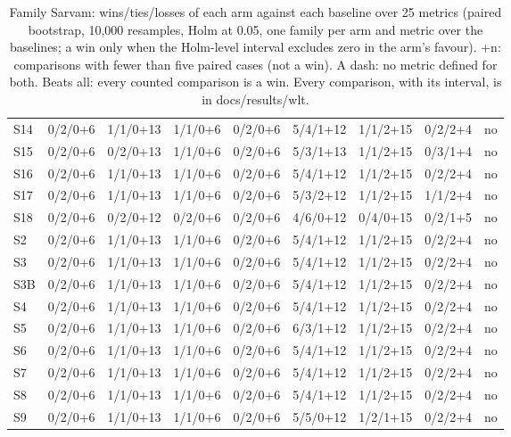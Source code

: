 \begin{table}[!t]
\begin{adjustbox}{max width=\textwidth}
\begin{tabular}{@{}lcccccccc@{}}
S14 & 0/2/0+6 & 1/1/0+13 & 1/1/0+6 & 0/2/0+6 & 5/4/1+12 & 1/1/2+15 & 0/2/2+4 & no \\
S15 & 0/2/0+6 & 0/2/0+13 & 1/1/0+6 & 0/2/0+6 & 5/3/1+13 & 1/1/2+15 & 0/3/1+4 & no \\
S16 & 0/2/0+6 & 1/1/0+13 & 1/1/0+6 & 0/2/0+6 & 5/4/1+12 & 1/1/2+15 & 0/2/2+4 & no \\
S17 & 0/2/0+6 & 1/1/0+13 & 1/1/0+6 & 0/2/0+6 & 5/3/2+12 & 1/1/2+15 & 1/1/2+4 & no \\
S18 & 0/2/0+6 & 0/2/0+12 & 0/2/0+6 & 0/2/0+6 & 4/6/0+12 & 0/4/0+15 & 0/2/1+5 & no \\
S2 & 0/2/0+6 & 1/1/0+13 & 1/1/0+6 & 0/2/0+6 & 5/4/1+12 & 1/1/2+15 & 0/2/2+4 & no \\
S3 & 0/2/0+6 & 1/1/0+13 & 1/1/0+6 & 0/2/0+6 & 5/4/1+12 & 1/1/2+15 & 0/2/2+4 & no \\
S3B & 0/2/0+6 & 1/1/0+13 & 1/1/0+6 & 0/2/0+6 & 5/4/1+12 & 1/1/2+15 & 0/2/2+4 & no \\
S4 & 0/2/0+6 & 1/1/0+13 & 1/1/0+6 & 0/2/0+6 & 5/4/1+12 & 1/1/2+15 & 0/2/2+4 & no \\
S5 & 0/2/0+6 & 1/1/0+13 & 1/1/0+6 & 0/2/0+6 & 6/3/1+12 & 1/1/2+15 & 0/2/2+4 & no \\
S6 & 0/2/0+6 & 1/1/0+13 & 1/1/0+6 & 0/2/0+6 & 5/4/1+12 & 1/1/2+15 & 0/2/2+4 & no \\
S7 & 0/2/0+6 & 1/1/0+13 & 1/1/0+6 & 0/2/0+6 & 5/4/1+12 & 1/1/2+15 & 0/2/2+4 & no \\
S8 & 0/2/0+6 & 1/1/0+13 & 1/1/0+6 & 0/2/0+6 & 5/4/1+12 & 1/1/2+15 & 0/2/2+4 & no \\
S9 & 0/2/0+6 & 1/1/0+13 & 1/1/0+6 & 0/2/0+6 & 5/5/0+12 & 1/2/1+15 & 0/2/2+4 & no \\
\bottomrule
\end{tabular}
\end{adjustbox}
\caption{Family Sarvam: wins/ties/losses of each arm against each baseline over 25 metrics (paired bootstrap, 10,000 resamples, Holm at 0.05, one family per arm and metric over the baselines; a win only when the Holm-level interval excludes zero in the arm's favour). +n: comparisons with fewer than five paired cases (not a win). A dash: no metric defined for both. Beats all: every counted comparison is a win. Every comparison, with its interval, is in docs/results/wlt.}
\label{tab:wlt_sarvam}
\end{table}
